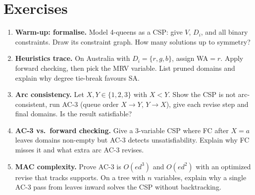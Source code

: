 \section{Exercises}
\label{sec:ch04-ex}
\begin{enumerate}[label=E4.\arabic*, leftmargin=*, itemsep=0.75em]
    \item \textbf{Warm-up: formalise.} Model 4-queens as a CSP: give $V$, $D_i$, and all binary constraints. Draw its constraint graph. How many solutions up to symmetry?
    \item \textbf{Heuristics trace.} On Australia with $D_i=\{r,g,b\}$, assign WA$=r$. Apply forward checking, then pick the MRV variable. List pruned domains and explain why degree tie-break favours SA.
    \item \textbf{Arc consistency.} Let $X,Y\in\{1,2,3\}$ with $X<Y$. Show the CSP is not arc-consistent, run AC-3 (queue order $X\!\to\!Y$, $Y\!\to\!X$), give each revise step and final domains. Is the result satisfiable?
    \item \textbf{AC-3 vs.\ forward checking.} Give a 3-variable CSP where FC after $X=a$ leaves domains non-empty but AC-3 detects unsatisfiability. Explain why FC misses it and what extra arc AC-3 revises.
    \item \textbf{MAC complexity.} Prove AC-3 is $O(ed^3)$ and $O(ed^2)$ with an optimized revise that tracks supports. On a tree with $n$ variables, explain why a single AC-3 pass from leaves inward solves the CSP without backtracking.
\end{enumerate}
